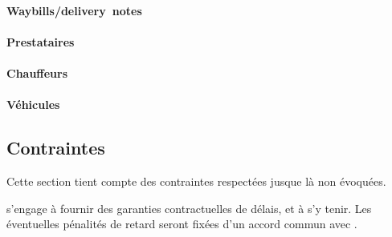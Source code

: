 \paragraph{Waybills/delivery~notes}

\paragraph{Prestataires}

\paragraph{Chauffeurs}

\paragraph{Véhicules}

\subsection{Contraintes}
Cette section tient compte des contraintes respectées jusque là non évoquées.

\begin{constraint}
\amo s'engage à fournir des garanties contractuelles de délais, et à s'y tenir. Les éventuelles pénalités de retard seront fixées d'un accord commun avec \mo.
\end{constraint}
